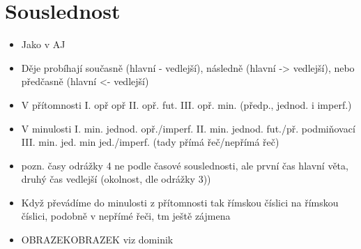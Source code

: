 \documentclass{article}
\begin{document}
\section{Souslednost}
\begin{itemize}
  \item Jako v AJ
  \item Děje probíhají současně (hlavní - vedlejší), následně (hlavní -> vedlejší), nebo předčasně (hlavní <- vedlejší)
  \item V přítomnosti I. opř opř II. opř. fut. III. opř. min. (předp., jednod. i imperf.)
  \item V minulosti I. min. jednod. opř./imperf. II. min. jednod. fut./př. podmiňovací III. min. jed. min jed./imperf. (tady přímá řeč/nepřímá řeč)
  \item pozn. časy odrážky 4 ne podle časové souslednosti, ale první čas hlavní věta, druhý čas vedlejší (okolnost, dle odrážky 3))
  \item Když převádíme do minulosti z přítomnosti tak římskou číslici na římskou číslici, podobně v nepřímé řeči, tm ještě zájmena
  \item OBRAZEKOBRAZEK viz dominik
\end{itemize}
\end{document}
